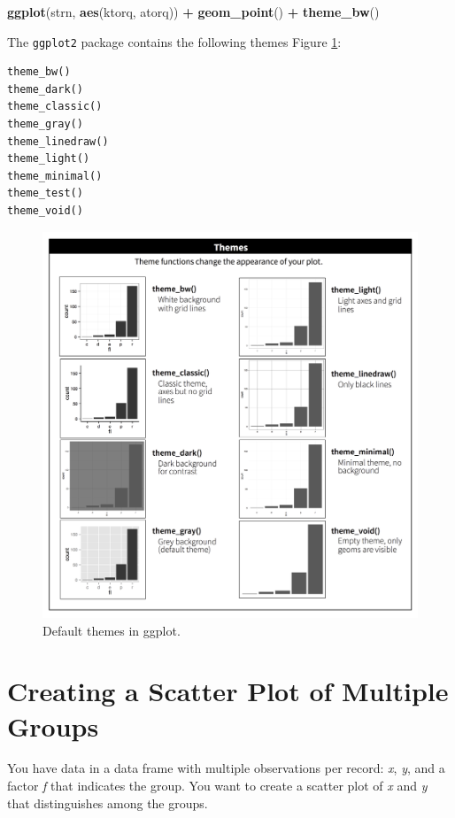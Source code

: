 \documentclass[
]{book}
\newenvironment{Shaded}{\begin{snugshade}}{\end{snugshade}}
\newcommand{\KeywordTok}[1]{\textcolor[rgb]{0.13,0.29,0.53}{\textbf{#1}}}
\newcommand{\NormalTok}[1]{#1}
\newcommand{\OperatorTok}[1]{\textcolor[rgb]{0.81,0.36,0.00}{\textbf{#1}}}
\newcommand{\StringTok}[1]{\textcolor[rgb]{0.31,0.60,0.02}{#1}}
\begin{document}
\begin{Shaded}
\begin{Highlighting}[]
\KeywordTok{ggplot}\NormalTok{(strn, }\KeywordTok{aes}\NormalTok{(ktorq, atorq)) }\OperatorTok{+}
\StringTok{  }\KeywordTok{geom_point}\NormalTok{() }\OperatorTok{+}
\StringTok{  }\KeywordTok{theme_bw}\NormalTok{()}
\end{Highlighting}
\end{Shaded}

The \texttt{ggplot2} package contains the following themes Figure \ref{fig:ggthemes}:

\begin{verbatim}
theme_bw()
theme_dark() 
theme_classic()
theme_gray()
theme_linedraw()
theme_light()
theme_minimal()
theme_test()
theme_void()
\end{verbatim}

\begin{figure}

{\centering \includegraphics[width=0.5\linewidth]{images/visualization-themes} 

}

\caption{Default themes in ggplot.}\label{fig:ggthemes}
\end{figure}

\hypertarget{creating-a-scatter-plot-of-multiple-groups}{%
\section{Creating a Scatter Plot of Multiple Groups}\label{creating-a-scatter-plot-of-multiple-groups}}

You have data in a data frame with multiple observations per record: \emph{x}, \emph{y}, and a
factor \emph{f} that indicates the group. You want to create a scatter
plot of \emph{x} and \emph{y} that distinguishes among the groups.
\end{document}
